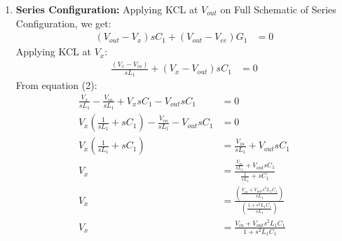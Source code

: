 \begin{enumerate}
    \paragraph{Total Parallel Response:}
      \begin{align*}
        V_{out} &= V_{out_1} + V_{out_2} \\
                &= H_1(s)V_{in} + H_2(s)V_{ee} \\
                &= \left(\frac{G_1}{G_1 + \frac{1}{sL_1} + sC_1}\right)V_{in} + \left(\frac{\frac{1}{sL_1} + sC_1}{G_1 + \frac{1}{sL_1} + sC_1}\right)V_{ee} \\
        \boxed{V_{out} = \frac{G_1}{G_1 + \frac{1}{sL_1} + sC_1}V_{in} + \frac{\frac{1}{sL_1} + sC_1}{G_1 + \frac{1}{sL_1} + sC_1}V_{ee}}
      \end{align*}
  \item \textbf{Series Configuration:}
    Applying KCL at $V_{out}$ on Full Schematic of Series
    Configuration, we get:
    \begin{align*}
      (V_{out} - V_{x})sC_1 + (V_{out} - V_{ee}){G_1} &= 0 \tag{1}
    \end{align*}
    Applying KCL at \(V_{x}\):
    \begin{align*}
      \frac{(V_{x} - V_{in})}{sL_1} + (V_{x} - V_{out})sC_1 &= 0 \tag{2}
    \end{align*}
    From equation (2):
    \begin{align*}
      \frac{V_{x}}{sL_1} - \frac{V_{in}}{sL_1} + V_{x}sC_1 - V_{out}sC_1 &= 0 \\
      V_{x}(\frac{1}{sL_1} + sC_1) - \frac{V_{in}}{sL_1} - V_{out}sC_1 &= 0 \\
      V_{x}(\frac{1}{sL_1} + sC_1) &= \frac{V_{in}}{sL_1} + V_{out}sC_1 \\
      V_{x} &= \frac{\frac{V_{in}}{sL_1} + V_{out}sC_1}{\frac{1}{sL_1} + sC_1} \\
      V_{x} &= \frac{\left(\frac{V_{in} + V_{out}s^2 L_1 C_1}{s L_1}\right)}{\left(\frac{1 + s^2 L_1 C_1}{s L_1}\right)} \\
      V_{x} &= \frac{V_{in} + V_{out}s^2 L_1 C_1}{1 + s^2 L_1 C_1} \tag{3}
    \end{align*}

\end{enumerate}
